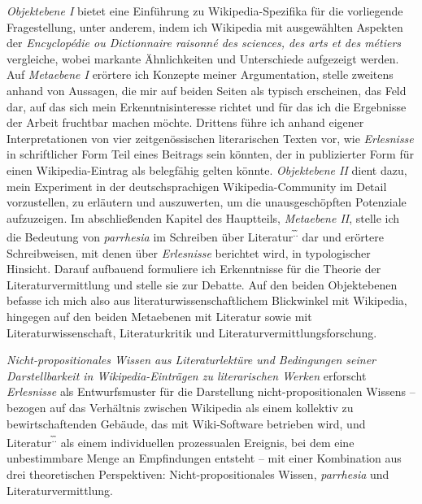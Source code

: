 \documentclass[fontsize=12pt]{scrartcl}
\begin{document}
\textit{Objektebene I} bietet eine Einf\"uh\-rung zu Wi\-ki\-pe\-dia-Spezifika f\"ur die vorliegende Fragestellung, unter anderem, indem ich Wi\-ki\-pe\-dia mit ausgew\"ahlten Aspekten der \textit{Encyclop\'{e}die ou Dictionnaire raisonn\'{e} des sciences, des arts et des m\'{e}tiers} vergleiche, wobei markante \"Ahnlichkeiten und Unterschiede aufgezeigt werden. Auf \textit{Metaebene I} er\"ortere ich Konzepte meiner Argumentation, stelle zweitens anhand von Aussagen, die mir auf beiden Seiten als ty\-pisch erscheinen, das Feld dar, auf das sich mein Erkenntnisinteresse richtet und f\"ur das ich die Ergebnisse der Arbeit fruchtbar machen m\"ochte. Drittens f\"uhre ich anhand eigener Interpretationen von \mbox{vier} zeitgen\"ossischen li\-te\-ra\-rischen Texten vor, wie \textit{Erlesnisse} in schriftlicher Form Teil eines Beitrags sein k\"onnten, der in pu\-bli\-zierter Form f\"ur einen Wi\-ki\-pe\-dia-Eintrag als belegf\"ahig gelten k\"onnte. \textit{Objektebene II} dient dazu, mein Experiment in der deutschspra\-chi\-gen Wi\-ki\-pe\-dia-Community im Detail vorzustellen, zu erl\"autern und auszuwerten, um die unausgesch\"opften Potenziale aufzuzeigen. Im abschlie{\ss}enden Kapitel des Hauptteils, \textit{Metaebene II}, stelle ich die Bedeutung von \textit{parrhesia} im Schrei\-ben \"uber Li\-te\-ra\-tur\textsuperscript{\~.\~.} dar und er\"ortere Schreibweisen, mit denen \"uber \textit{Erlesnisse} berichtet wird, in typologischer Hinsicht. Darauf aufbauend formuliere ich Erkenntnisse f\"ur die Theorie der Li\-te\-ra\-tur\-ver\-mitt\-lung und stelle sie zur Debatte. Auf den beiden Objektebenen befasse ich mich also aus literaturwissenschaftlichem Blickwinkel mit Wikipedia, hingegen auf den beiden Metaebenen mit Literatur sowie mit Literaturwissenschaft, Literaturkritik und Literaturvermittlungsforschung.

\textit{Nicht-pro\-po\-si\-ti\-o\-na\-les Wissen aus Li\-te\-ra\-tur\-lekt\"ure und Bedingungen seiner Darstellbarkeit in Wi\-ki\-pe\-dia-Eintr\"agen zu li\-te\-ra\-rischen Werken} erforscht \textit{Erlesnisse} als Entwurfsmuster f\"ur die Darstellung nicht-pro\-po\-si\-ti\-o\-na\-len Wissens -- bezogen auf das Verh\"altnis zwischen Wi\-ki\-pe\-dia als einem kollektiv zu bewirtschaftenden Geb\"aude, das mit Wiki-Software betrieben wird, und Li\-te\-ra\-tur\textsuperscript{\~.\~.} als einem individuellen prozessualen Ereignis, bei dem eine unbestimmbare Menge an Emp\-fin\-dun\-gen entsteht -- mit einer Kombination aus drei theo\-retischen Perspektiven: Nicht-pro\-po\-si\-ti\-o\-na\-les Wissen, \textit{parrhesia} und Li\-te\-ra\-tur\-ver\-mitt\-lung.
\end{document}

